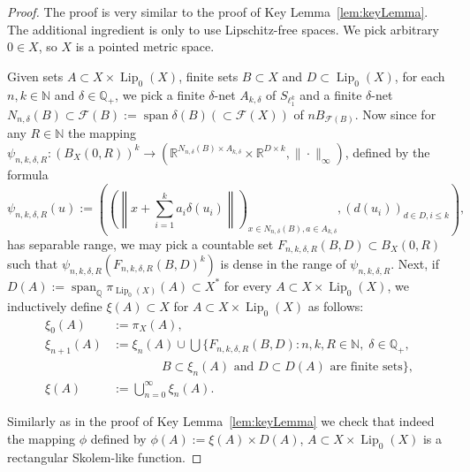 \documentclass[11pt]{amsart}
\theoremstyle{definition}
\theoremstyle{remark}
\newcommand{\Nat}{\mathbb N}
\newcommand{\Rat}{\mathbb Q}
\newcommand{\F}{\mathcal F}
\newcommand{\Span}{\operatorname{span}}
\def \Lip {\operatorname{Lip}}
\begin{document}
\begin{proof}The proof is very similar to the proof of Key Lemma~\ref{lem:keyLemma}. The additional ingredient is only to use Lipschitz-free spaces. We pick arbitrary $0\in X$, so $X$ is a pointed metric space.

Given sets $A\subset X\times \Lip_0(X)$, finite sets $B\subset X$ and $D\subset \Lip_0(X)$, for each $n,k \in \Nat$ and $\delta\in \Rat_+$, we pick a finite $\delta$-net $A_{k,\delta}$ of $S_{\ell_1^k}$ and a finite $\delta$-net $N_{n,\delta}(B)\subset \F(B) := \Span \delta(B) (\subset \F(X))$ of $nB_{\F(B)}$. Now since for any $R\in\Nat$ the mapping $\psi_{n,k,\delta,R}: (B_X(0,R))^k \to (\mathbb{R}^{N_{n,\delta}(B) \times A_{k,\delta}} \times \mathbb{R}^{D \times k},\|\cdot\|_\infty)$, defined by the formula
\[
		\psi_{n,k,\delta,R}(u) := \left(\left(\left\|x + \sum_{i=1}^{k} a_i\delta(u_i) \right\|\right)_{x\in N_{n,\delta}(B),a\in A_{k,\delta}},\left(d(u_i)\right)_{d\in D, i\leq k}\right),
\]
has separable range, we may pick a countable set $F_{n,k,\delta,R}(B,D)\subset B_X(0,R)$ such that $\psi_{n,k,\delta,R}(F_{n,k,\delta,R}(B,D)^k)$ is dense in the range of $\psi_{n,k,\delta,R}$.
Next, if $D(A):=\Span_\Rat \pi_{\Lip_0(X)}(A)\subset X^*$ for every $A\subset X\times \Lip_0(X)$, we inductively define $\xi(A)\subset X$ for $A\subset X\times \Lip_0(X)$ as follows:
\[\begin{split}
\xi_0(A)&:=\pi_X(A),\\
\xi_{n+1}(A)&:=\xi_n(A)\cup \bigcup\Big\{F_{n,k,\delta,R}(B,D)\colon n,k,R\in\Nat,\; \delta\in\Rat_+,\\
&\qquad\qquad B\subset \xi_n(A) \text{ and } D\subset D(A) \text{ are finite sets}\Big\},\\
\xi(A)&:=\bigcup_{n=0}^\infty \xi_n(A).
\end{split}\]

Similarly as in the proof of Key Lemma~\ref{lem:keyLemma} we check that indeed the mapping $\phi$ defined by $\phi(A):=\xi(A)\times D(A)$, $A\subset X\times \Lip_0(X)$ is a rectangular Skolem-like function.


\end{proof}
\end{document}
